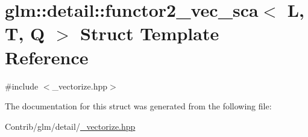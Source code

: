 \hypertarget{structglm_1_1detail_1_1functor2__vec__sca}{}\section{glm\+:\+:detail\+:\+:functor2\+\_\+vec\+\_\+sca$<$ L, T, Q $>$ Struct Template Reference}
\label{structglm_1_1detail_1_1functor2__vec__sca}


{\ttfamily \#include $<$\+\_\+vectorize.\+hpp$>$}



The documentation for this struct was generated from the following file\+:\begin{DoxyCompactItemize}
\item 
Contrib/glm/detail/\mbox{\hyperlink{__vectorize_8hpp}{\+\_\+vectorize.\+hpp}}\end{DoxyCompactItemize}
